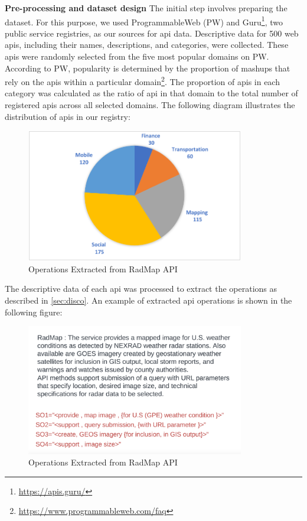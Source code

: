 \textbf{Pre-processing and dataset design}
The initial step involves preparing the dataset. For this purpose, we
used ProgrammableWeb (PW) and Guru\footnote{\url{https://apis.guru/}},
two public service registries, as our sources for \gls{api} data. Descriptive
data for 500 web \gls{api}s, including their names, descriptions, and
categories, were collected. These \gls{api}s were randomly selected from the
five most popular domains on PW. According to PW, popularity is
determined by the proportion of mashups that rely on the \gls{api}s within a
particular domain\footnote{\url{https://www.programmableweb.com/faq}}.
The proportion of \gls{api}s in each category was calculated as the ratio of
\gls{api} in that domain to the total number of registered \gls{api}s across all
selected domains. The following diagram illustrates the distribution of
\gls{api}s in our registry: 

\begin{figure}[hbt]
\hypertarget{fig:disco-evaluation-result}{%
\centering
\includegraphics[width=0.85\textwidth]{../figures/MyFigures/APIStat.pdf}
\captionsetup{justification=centering}
\caption{Operations Extracted from RadMap API}\label{fig:disco-APIStat}
}
\end{figure}


The descriptive data of each \gls{api} was processed to extract the operations as described in \cref{sec:disco}. An example of extracted \gls{api} operations is shown in the following figure:

\begin{figure}[hbt]
\hypertarget{fig:disco-evaluation-result}{%
\centering
\includegraphics[width=0.85\textwidth]{../figures/MyFigures/radmap.png}
\captionsetup{justification=centering}
\caption{Operations Extracted from RadMap API}\label{fig:disco-evaluation-result}
}
\end{figure}

